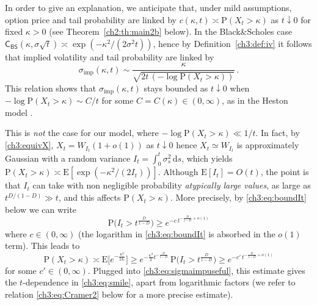 \documentclass[a4paper,reqno,11pt]{amsart}
\numberwithin{equation}{section}
\newcommand{\dd}{\text{\rm d}}             %
\newcommand{\PEfont}{\mathrm}
\renewcommand{\P}{\ensuremath{\PEfont P}}
\newcommand{\E}{\ensuremath{\PEfont E}}
\def\dd{\mathrm{d}}
\newcommand\CBS{\mathsf{C_{BS}}}
\newcommand\imp{\mathrm{imp}}
\begin{document}
In order to give an explanation, 
we anticipate that, under mild assumptions, option price and tail probability are linked
by $c(\kappa,t) \asymp \P(X_t > \kappa)$ as $t \downarrow 0$
for fixed $\kappa > 0$
(see Theorem~\ref{ch2:th:main2b} below). In the Black\&Scholes
case $\CBS(\kappa, \sigma \sqrt{t}) \asymp
\exp(-\kappa^2 / (2 \sigma^2 t))$, hence by Definition~\ref{ch3:def:iv} it follows that
implied volatility and tail probability are linked by
\begin{equation} \label{ch3:eq:sigmaimpuseful}
	\sigma_\imp(\kappa,t) \sim \frac{\kappa}{\sqrt{2 t \,(- \log \P(X_t > \kappa))}} \,.
\end{equation}
This relation shows that $\sigma_\imp(\kappa,t)$ stays bounded as $t \downarrow 0$
when $-\log \P(X_t > \kappa) \sim C/t$ for some 
$C = C(\kappa) \in (0,\infty)$, as in the Heston model \cite{cf:JFL12}. 

This is \emph{not} the case for our model, where
$-\log \P(X_t > \kappa) \ll 1/t$. In fact, by \eqref{ch3:equivX},
$X_t =  W_{I_t}(1+o(1))$
as $t\downarrow 0$ hence $X_t \simeq W_{I_t}$
is approximately Gaussian with a random variance $I_t = \int_0^t \sigma_s^2 \, \dd s$,
which yields $\P(X_t > \kappa) \asymp \E[\exp(-\kappa^2/(2I_t))]$.
Although $\E[I_t] = O(t)$, the point is that $I_t$ can take with non negligible
probability \emph{atypically large values}, as large as $t^{D/(1-D)} \gg t$,
and this affects $\P(X_t > \kappa)$.
More precisely, by \eqref{ch3:eq:boundIt} below we can write
\begin{equation*}
	\P\Big(I_t > t^{\frac{D}{1-D}} \Big) \ge e^{-c \, t^{-\frac{D}{1-D} + o(1)}}
\end{equation*}
where $c \in (0,\infty)$ (the logarithm in \eqref{ch3:eq:boundIt} is absorbed in the $o(1)$ term).
This leads to 
\begin{equation*}
	\P(X_t > \kappa) \asymp \E\Big[ e^{-\frac{\kappa^2}{2I_t}} \Big]
	\ge e^{-\frac{\kappa^2}{2}  t^{-\frac{D}{1-D}}} \, \P\Big(I_t > t^{\frac{D}{1-D}} \Big)
	\ge e^{-c' \, t^{-\frac{D}{1-D} + o(1)}}
\end{equation*}
for some $c' \in (0,\infty)$.
Plugged into \eqref{ch3:eq:sigmaimpuseful}, this estimate gives the $t$-dependence
in \eqref{ch3:eq:smile}, apart from logarithmic factors
(we refer to relation \eqref{ch3:eq:Cramer2} below for a more precise estimate).
\end{document}
